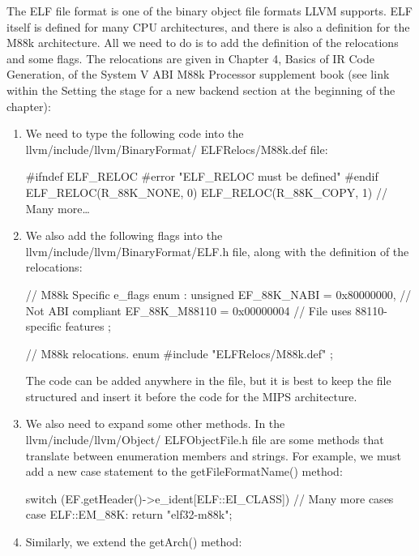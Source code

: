 The ELF file format is one of the binary object file formats LLVM supports. ELF itself is defined for many CPU architectures, and there is also a definition for the M88k architecture. All we need to do is to add the definition of the relocations and some flags. The relocations are given in Chapter 4, Basics of IR Code Generation, of the System V ABI M88k Processor supplement book (see link within the Setting the stage for a new backend section at the beginning of the chapter):

\begin{enumerate}
\item
We need to type the following code into the llvm/include/llvm/BinaryFormat/ ELFRelocs/M88k.def file:

\begin{cpp}
#ifndef ELF_RELOC
#error "ELF_RELOC must be defined"
#endif
ELF_RELOC(R_88K_NONE, 0)
ELF_RELOC(R_88K_COPY, 1)
// Many more…
\end{cpp}

\item
We also add the following flags into the llvm/include/llvm/BinaryFormat/ELF.h file, along with the definition of the relocations:

\begin{cpp}
// M88k Specific e_flags
enum : unsigned {
    EF_88K_NABI = 0x80000000, // Not ABI compliant
    EF_88K_M88110 = 0x00000004 // File uses 88110-specific
    features
};

// M88k relocations.
enum {
    #include "ELFRelocs/M88k.def"
};
\end{cpp}

The code can be added anywhere in the file, but it is best to keep the file structured and insert it before the code for the MIPS architecture.

\item
We also need to expand some other methods. In the llvm/include/llvm/Object/ ELFObjectFile.h file are some methods that translate between enumeration members and strings. For example, we must add a new case statement to the getFileFormatName() method:

\begin{cpp}
switch (EF.getHeader()->e_ident[ELF::EI_CLASS]) {
    // Many more cases
    case ELF::EM_88K:
    return "elf32-m88k";
}
\end{cpp}

\item
Similarly, we extend the getArch() method:

\begin{cpp}
switch (EF.getHeader().e_machine) {
    // Many more cases
    case ELF::EM_88K:
    return Triple::m88k;
\end{cpp}


\end{enumerate}
